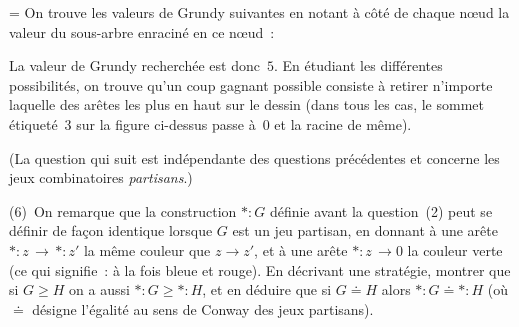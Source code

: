 \documentclass[12pt,a4paper]{article}
\theoremstyle{definition}
\newif\ifcorrige
\newenvironment{corrige}%
{\ifcorrige\relax\else\setbox0=\vbox\bgroup\fi%
\smallbreak\noindent{\underbar{\textit{Corrigé.}}\quad}}
{{\hbox{}\nobreak\hfill\checkmark}%
\ifcorrige\relax\else\egroup\fi\par}
\begin{document}
\begin{corrige}
On trouve les valeurs de Grundy suivantes en notant à côté de chaque
nœud la valeur du sous-arbre enraciné en ce nœud :
\begin{center}
\end{center}

La valeur de Grundy recherchée est donc $5$.  En étudiant les
différentes possibilités, on trouve qu'un coup gagnant possible
consiste à retirer n'importe laquelle des arêtes les plus en haut sur
le dessin (dans tous les cas, le sommet étiqueté $3$ sur la figure
ci-dessus passe à $0$ et la racine de même).
\end{corrige}

\smallbreak

(La question qui suit est indépendante des questions précédentes et
concerne les jeux combinatoires \emph{partisans}.)

(6) On remarque que la construction $*{:}G$ définie avant la
question (2) peut se définir de façon identique lorsque $G$ est un jeu
partisan, en donnant à une arête $*{:}z\, \to \, *{:}z'$ la même
couleur que $z\to z'$, et à une arête $*{:}z\, \to 0$ la couleur verte
(ce qui signifie : à la fois bleue et rouge).  En décrivant une
stratégie, montrer que si $G \geq H$ on a aussi $*{:}G \geq *{:}H$, et
en déduire que si $G\doteq H$ alors $*{:}G \doteq *{:}H$ (où $\doteq$
désigne l'égalité au sens de Conway des jeux partisans).
\end{document}
